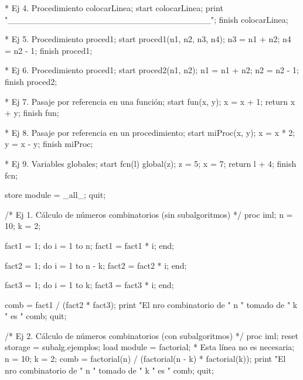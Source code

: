 \documentclass[
]{book}
\newenvironment{Shaded}{\begin{snugshade}}{\end{snugshade}}
\newcommand{\NormalTok}[1]{#1}
\begin{document}
\begin{Shaded}
\begin{Highlighting}[]
\NormalTok{    * Ej 4. Procedimiento colocarLinea;}
\NormalTok{    start colocarLinea;}
\NormalTok{        print "\_\_\_\_\_\_\_\_\_\_\_\_\_\_\_\_\_\_\_\_\_\_\_\_\_\_\_\_\_\_\_\_\_";}
\NormalTok{    finish colocarLinea;}

\NormalTok{    * Ej 5. Procedimiento proced1;}
\NormalTok{    start proced1(n1, n2, n3, n4);}
\NormalTok{        n3 = n1 + n2;}
\NormalTok{        n4 = n2 {-} 1;}
\NormalTok{    finish proced1;}

\NormalTok{    * Ej 6. Procedimiento proced1;}
\NormalTok{    start proced2(n1, n2);}
\NormalTok{        n1 = n1 + n2;}
\NormalTok{        n2 = n2 {-} 1;}
\NormalTok{    finish proced2;}

\NormalTok{    * Ej 7. Pasaje por referencia en una función;}
\NormalTok{    start fun(x, y);}
\NormalTok{        x = x + 1;}
\NormalTok{        return x + y;}
\NormalTok{    finish fun;}

\NormalTok{    * Ej 8. Pasaje por referencia en un procedimiento;}
\NormalTok{    start miProc(x, y);}
\NormalTok{        x = x * 2;}
\NormalTok{        y = x {-} y;}
\NormalTok{    finish miProc;}

\NormalTok{    * Ej 9. Variables globales;}
\NormalTok{    start fcn(l) global(z);}
\NormalTok{        z = 5;}
\NormalTok{        x = 7;}
\NormalTok{        return l + 4;}
\NormalTok{    finish fcn;}

\NormalTok{    store module = \_all\_;}
\NormalTok{quit;}

\NormalTok{/* Ej 1. Cálculo de números combinatorios (sin subalgoritmos) */}
\NormalTok{proc iml;}
\NormalTok{    n = 10;}
\NormalTok{    k = 2;}

\NormalTok{    fact1 = 1;}
\NormalTok{    do i = 1 to n;}
\NormalTok{        fact1 = fact1 * i;}
\NormalTok{    end;}

\NormalTok{    fact2 = 1;}
\NormalTok{    do i = 1 to n {-} k;}
\NormalTok{        fact2 = fact2 * i;}
\NormalTok{    end;}

\NormalTok{    fact3 = 1;}
\NormalTok{    do i = 1 to k;}
\NormalTok{        fact3 = fact3 * i;}
\NormalTok{    end;}

\NormalTok{    comb = fact1 / (fact2 * fact3);}
\NormalTok{    print "El nro combinatorio de " n " tomado de " k " es " comb; }
\NormalTok{quit;}

\NormalTok{/* Ej 2. Cálculo de números combinatorios (con subalgoritmos) */}
\NormalTok{proc iml;}
\NormalTok{    reset storage = subalg.ejemplos;}
\NormalTok{    load module = factorial; * Esta línea no es necesaria;}
\NormalTok{    n = 10;}
\NormalTok{    k = 2;}
\NormalTok{    comb = factorial(n) / (factorial(n {-} k) * factorial(k));}
\NormalTok{    print "El nro combinatorio de " n " tomado de " k " es " comb; }
\NormalTok{quit;}


\end{Highlighting}
\end{Shaded}
\end{document}
